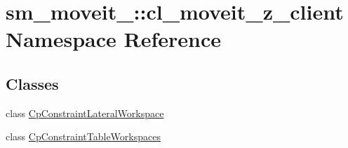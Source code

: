 \hypertarget{namespacesm__moveit__4_1_1cl__moveit__z__client}{}\section{sm\+\_\+moveit\+\_\+:\+:cl\+\_\+moveit\+\_\+z\+\_\+client Namespace Reference}
\label{namespacesm__moveit__4_1_1cl__moveit__z__client}
\subsection*{Classes}
\begin{DoxyCompactItemize}
\item 
class \hyperlink{classsm__moveit__4_1_1cl__moveit__z__client_1_1CpConstraintLateralWorkspace}{Cp\+Constraint\+Lateral\+Workspace}
\item 
class \hyperlink{classsm__moveit__4_1_1cl__moveit__z__client_1_1CpConstraintTableWorkspaces}{Cp\+Constraint\+Table\+Workspaces}
\end{DoxyCompactItemize}
